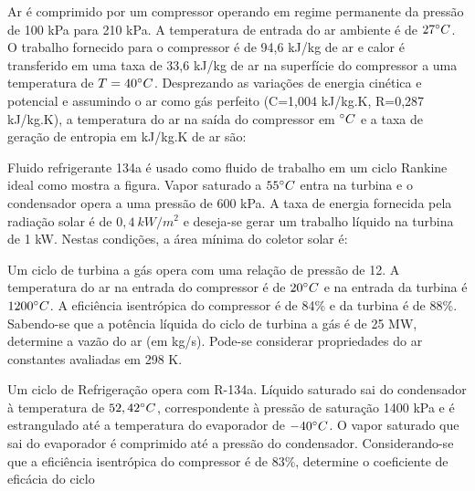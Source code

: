 \documentclass[answers]{exam}
\begin{document}
\begin{questions}
  \question Ar é comprimido por um compressor operando em regime permanente da pressão de 100 kPa para 210 kPa. A temperatura de entrada do ar ambiente é de $27\degree C$. O trabalho fornecido para o compressor é de 94,6 kJ/kg de ar e calor é transferido em uma taxa de 33,6 kJ/kg de ar na superfície do compressor a uma temperatura de $T = 40\degree C$. Desprezando as variações de energia cinética e potencial e assumindo o ar como gás perfeito (C=1,004 kJ/kg.K, R=0,287 kJ/kg.K), a temperatura do ar na saída do compressor em $\degree C$ e a taxa de geração de entropia em kJ/kg.K de ar são:



  \question Fluido refrigerante 134a é usado como fluido de trabalho em um ciclo Rankine ideal como mostra a figura. Vapor saturado a $55\degree C$ entra na turbina e o condensador opera a uma pressão de 600 kPa. A taxa de energia fornecida pela radiação solar é de $0,4\ kW/m^2$ e deseja-se gerar um trabalho líquido na turbina de 1 kW. Nestas condições, a área mínima do coletor solar é:



  \question Um ciclo de turbina a gás opera com uma relação de pressão de 12. A temperatura do ar na entrada do compressor é de $20\degree C$ e na entrada da turbina é $1200\degree C$. A eficiência isentrópica do compressor é de 84\% e da turbina é de 88\%. Sabendo-se que a potência líquida do ciclo de turbina a gás é de 25 MW, determine a vazão do ar (em kg/s). Pode-se considerar propriedades do ar constantes avaliadas em 298 K.



  \question Um ciclo de Refrigeração opera com R-134a. Líquido saturado sai do condensador à temperatura de $52,42\degree C$, correspondente à pressão de saturação 1400 kPa e é estrangulado até a temperatura do evaporador de $-40\degree C$. O vapor saturado que sai do evaporador é comprimido até a pressão do condensador. Considerando-se que a eficiência isentrópica do compressor é de 83\%, determine o coeficiente de eficácia do ciclo
\end{questions}
\end{document}
